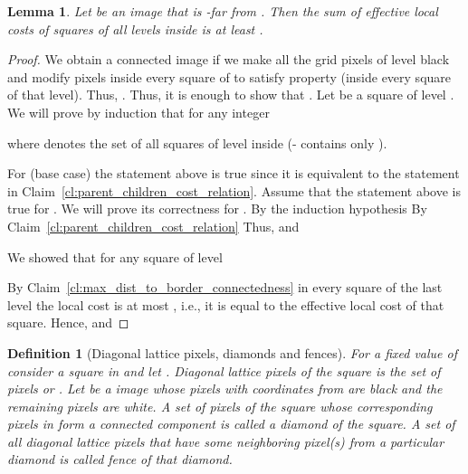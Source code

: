 \documentclass[11pt,english]{article}
\newtheorem{lemma}[theorem]{Lemma}
\newtheorem{definition}{Definition}[section]
\numberwithin{figure}{section}
\begin{document}
\begin{lemma}
\label{lm:sum_of_local_costs}
Let  be an  image that is -far from . Then the sum of
effective local costs of squares of all levels inside  is at least .
\end{lemma}
\begin{proof}
We obtain a connected image if we make all the grid pixels of level  black and modify pixels inside every square of  to satisfy property 
 (inside every square of that level).
Thus, . Thus,
it is enough to show that
. Let  be a square of level . We will prove by induction that for any integer 


 where
 denotes the set of all
squares of level  inside  (- contains
only ).

For  (base case) the statement above is true since it is equivalent to the
statement in Claim~\ref{cl:parent_children_cost_relation}. Assume
that the statement above is true for . We will prove its correctness for
.
By the induction hypothesis 
By Claim~\ref{cl:parent_children_cost_relation}
 Thus,
 and


We showed that for any square  of level 

By Claim~\ref{cl:max_dist_to_border_connectedness} in every square of the last
level the local cost is at most , i.e., it is equal to the effective local cost of that square. Hence,
 and

\end{proof}

\begin{definition}[Diagonal lattice pixels, diamonds and fences]
\label{def:diagonal_lattice_pixels_and_regions}
For a fixed value of  consider a square in  and let
. \emph{Diagonal lattice pixels} of
the square is the set of pixels  or . Let
 be a  image whose pixels with coordinates from  are black and the remaining pixels are white.
A set of pixels of the square whose corresponding pixels
in  form a connected component is called a \emph{diamond} of the square.
A set of all diagonal lattice pixels that have some neighboring
pixel(s) from a particular diamond is called \emph{fence} of that diamond.
\end{definition}
\end{document}
